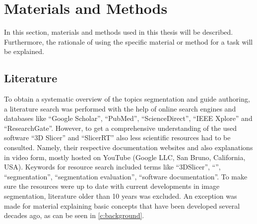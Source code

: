 
\chapter{Materials and Methods}\label{c:materialsNmethods}

In this section, materials and methods used in this thesis will be described.
Furthermore, the rationale of using the specific material or method for a task will be explained.

\section{Literature}\label{s:literature}
To obtain a systematic overview of the topics \mct\space segmentation and guide authoring, a literature search was performed with the help of online search engines and databases like ``Google Scholar'', ``PubMed'', ``ScienceDirect'', ``IEEE Xplore'' and ``ResearchGate''.
However, to get a comprehensive understanding of the used software ``3D Slicer'' and ``SlicerRT'' also less scientific resources had to be consulted.
Namely, their respective documentation websites and also explanations in video form, mostly hosted on YouTube (Google LLC, San Bruno, California, USA).
Keywords for resource search included terms like ``3DSlicer'', ``\mct'', ``segmentation'', ``segmentation evaluation'', ``software documentation''.
To make sure the resources were up to date with current developments in image segmentation, literature older than 10 years was excluded.
An exception was made for material explaining basic concepts that have been developed several decades ago, as can be seen in \cref{c:background}.


